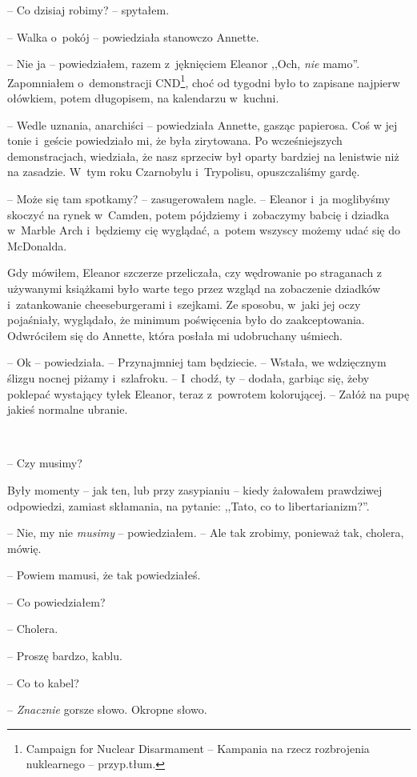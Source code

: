 \documentclass[oneside,polish,11pt,sfheadings]{mwbk}
\begin{document}
-- Co dzisiaj robimy? -- spytałem.

-- Walka o~pokój -- powiedziała stanowczo Annette.

-- Nie ja -- powiedziałem, razem z~jęknięciem Eleanor ,,Och, \emph{nie}
mamo''. Zapomniałem o~demonstracji CND\footnote{Campaign for Nuclear
Disarmament -- Kampania na rzecz rozbrojenia nuklearnego -- przyp.tłum.},
choć od tygodni było to zapisane najpierw ołówkiem, potem długopisem, na
kalendarzu w~kuchni.

-- Wedle uznania, anarchiści -- powiedziała Annette, gasząc papierosa. Coś
w jej tonie i~geście powiedziało mi, że była zirytowana. Po
wcześniejszych demonstracjach, wiedziała, że nasz sprzeciw był oparty
bardziej na lenistwie niż na zasadzie. W~tym roku Czarnobylu i~Trypolisu, opuszczaliśmy gardę.

-- Może się tam spotkamy? -- zasugerowałem nagle. -- Eleanor i~ja
moglibyśmy skoczyć na rynek w~Camden, potem pójdziemy i~zobaczymy babcię
i dziadka w~Marble Arch i~będziemy cię wyglądać, a~potem wszyscy możemy
udać się do McDonalda.

Gdy mówiłem, Eleanor szczerze przeliczała, czy wędrowanie po straganach
z używanymi książkami było warte tego przez wzgląd na zobaczenie
dziadków i~zatankowanie cheeseburgerami i~szejkami. Ze sposobu, w~jaki
jej oczy pojaśniały, wyglądało, że minimum poświęcenia było do
zaakceptowania. Odwróciłem się do Annette, która posłała mi udobruchany
uśmiech.

-- Ok -- powiedziała. -- Przynajmniej tam będziecie. -- Wstała, we
wdzięcznym ślizgu nocnej piżamy i~szlafroku. -- I~chodź, ty -- dodała,
garbiąc się, żeby poklepać wystający tyłek Eleanor, teraz z~powrotem
kolorującej. -- Załóż na pupę jakieś normalne ubranie.

~

-- Czy musimy?

Były momenty -- jak ten, lub przy zasypianiu -- kiedy żałowałem prawdziwej
odpowiedzi, zamiast skłamania, na pytanie: ,,Tato, co to libertarianizm?''.

-- Nie, my nie \emph{musimy} -- powiedziałem. -- Ale tak zrobimy, ponieważ
tak, cholera, mówię.

-- Powiem mamusi, że tak powiedziałeś.

-- Co powiedziałem?

-- Cholera.

-- Proszę bardzo, kablu.

-- Co to kabel?

-- \emph{Znacznie} gorsze słowo. Okropne słowo.
\end{document}
